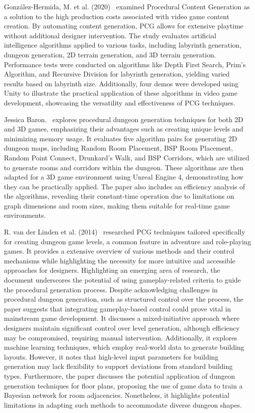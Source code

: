 \documentclass[runningheads]{llncs}
\begin{document}
González-Hermida, M. et al. (2020)~\cite{ref_article1} examined Procedural Content Generation as a solution to the high production costs associated with video game content creation. By automating content generation, PCG allows for extensive playtime without additional designer intervention. The study evaluates artificial intelligence algorithms applied to various tasks, including labyrinth generation, dungeon generation, 2D terrain generation, and 3D terrain generation. Performance tests were conducted on algorithms like Depth First Search, Prim’s Algorithm, and Recursive Division for labyrinth generation, yielding varied results based on labyrinth size. Additionally, four demos were developed using Unity to illustrate the practical application of these algorithms in video game development, showcasing the versatility and effectiveness of PCG techniques.

 Jessica Baron.~\cite{ref_article6} explores procedural dungeon generation techniques for both 2D and 3D games, emphasizing their advantages such as creating unique levels and minimizing memory usage. It evaluates five algorithm pairs for generating 2D dungeon maps, including Random Room Placement, BSP Room Placement, Random Point Connect, Drunkard’s Walk, and BSP Corridors, which are utilized to generate rooms and corridors within the dungeon. These algorithms are then adapted for a 3D game environment using Unreal Engine 4, demonstrating how they can be practically applied. The paper also includes an efficiency analysis of the algorithms, revealing their constant-time operation due to limitations on graph dimensions and room sizes, making them suitable for real-time game environments.

R. van der Linden et al. (2014)~\cite{ref_article8} researched PCG techniques tailored specifically for creating dungeon game levels, a common feature in adventure and role-playing games. It provides a extensive overview of various methods and their control mechanisms while highlighting the necessity for more intuitive and accessible approaches for designers. Highlighting an emerging area of research, the document underscores the potential of using gameplay-related criteria to guide the procedural generation process. Despite acknowledging challenges in procedural dungeon generation, such as structured control over the process, the paper suggests that integrating gameplay-based control could prove vital in mainstream game development. It discusses a mixed-initiative approach where designers maintain significant control over level generation, although efficiency may be compromised, requiring manual intervention. Additionally, it explores machine learning techniques, which employ real-world data to generate building layouts. However, it notes that high-level input parameters for building generation may lack flexibility to support deviations from standard building types. Furthermore, the paper discusses the potential application of dungeon generation techniques for floor plans, proposing the use of game data to train a Bayesian network for room adjacencies. Nonetheless, it highlights potential limitations in adapting such methods to accommodate diverse dungeon shapes.
\end{document}
